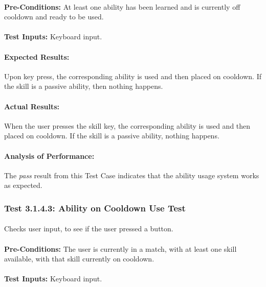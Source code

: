 \documentclass{article}
\begin{document}
    \paragraph{}\textbf{Pre-Conditions:} At least one ability has been learned and is currently off cooldown and ready to be used.
    \paragraph{}\textbf{Test Inputs:} Keyboard input.
    \paragraph{Expected Results:} Upon key press, the corresponding ability is used and then placed on cooldown. If the skill is a passive ability, then nothing happens.
    \paragraph{Actual Results:} When the user presses the skill key, the corresponding ability is used and then placed on cooldown. If the skill is a passive ability, nothing happens. 
    \paragraph{Analysis of Performance:}The \emph{pass} result from this Test Case indicates that the ability usage system works as expected.
    
    \subsubsection{Test 3.1.4.3: Ability on Cooldown Use Test}
    \paragraph{}\textbf{}
    \paragraph{}Checks user input, to see if the user pressed a button.
    \paragraph{}\textbf{Pre-Conditions:} The user is currently in a match, with at least one skill available, with that skill currently on cooldown.
    \paragraph{}\textbf{Test Inputs:} Keyboard input.
\end{document}
